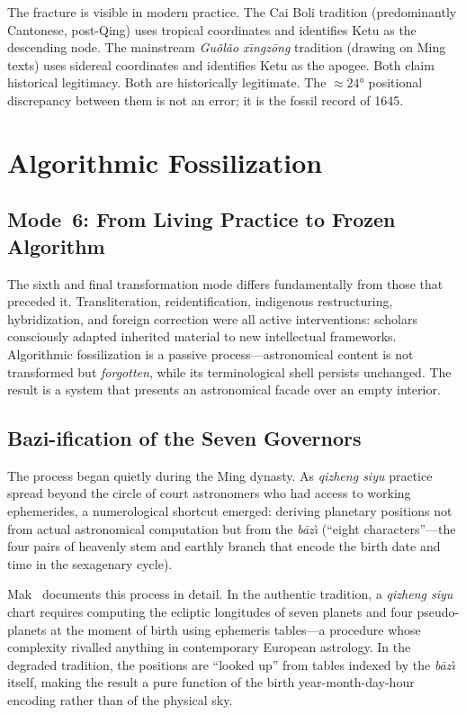 \documentclass[10pt,a4paper]{article}
\providecommand{\degree}{\ensuremath{°}}
\begin{document}
The fracture is visible in modern practice.  The Cai Boli tradition
(predominantly Cantonese, post-Qing) uses tropical coordinates and
identifies Ketu as the descending node.  The mainstream
\textit{Gu\v{o}l\v{a}o x\={\i}ngz\={o}ng} tradition (drawing on Ming texts) uses sidereal
coordinates and identifies Ketu as the apogee.  Both claim
historical legitimacy.  Both are historically legitimate.  The
$\approx 24\degree$ positional discrepancy between them is not an
error; it is the fossil record of 1645.

\section{Algorithmic Fossilization}\label{sec:fossil}

\subsection*{Mode~6: From Living Practice to Frozen Algorithm}

The sixth and final transformation mode differs fundamentally from those that
preceded it.  Transliteration, reidentification, indigenous restructuring,
hybridization, and foreign correction were all active interventions: scholars
consciously adapted inherited material to new intellectual frameworks.
Algorithmic fossilization is a passive process---astronomical content is not
transformed but \emph{forgotten}, while its terminological shell persists
unchanged.  The result is a system that presents an astronomical facade over an
empty interior.

\subsection*{Bazi-ification of the Seven Governors}

The process began quietly during the Ming dynasty.  As \textit{qizheng siyu} practice
spread beyond the circle of court astronomers who had access to working
ephemerides, a numerological shortcut emerged: deriving planetary positions not
from actual astronomical computation but from the \textit{b\={a}z\`{\i}}
(``eight characters''---the four pairs of heavenly stem and earthly branch that
encode the birth date and time in the sexagenary cycle).

Mak~\cite{mak2014pseudoplanets} documents this process in detail.  In the
authentic tradition, a \textit{qizheng siyu} chart requires computing the ecliptic
longitudes of seven planets and four pseudo-planets at the moment of birth
using ephemeris tables---a procedure whose complexity rivalled anything in
contemporary European astrology.  In the degraded tradition, the positions are
``looked up'' from tables indexed by the \textit{b\={a}z\`{\i}} itself, making the result a
pure function of the birth year-month-day-hour encoding rather than of the
physical sky.
\end{document}
